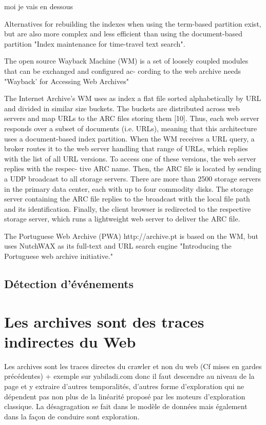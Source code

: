 \documentclass[symmetric,justified,marginals=raggedouter]{tufte-book}
\begin{document}
moi je vais en dessous 

Alternatives  for  rebuilding  the  indexes
when using the term-based partition exist, but are also more
complex  and  less  efficient  than  using  the  document-based
partition "Index maintenance for time-travel text
search".

The open source Wayback Machine (WM) is a set of loosely
coupled modules that can be exchanged and configured ac-
cording  to  the  web  archive  needs  "Wayback’ for Accessing Web Archives"

The Internet Archive’s WM uses as index a flat file sorted
alphabetically by URL and divided in similar size buckets.
The  buckets  are  distributed  across  web  servers  and  map
URLs to the ARC files storing them [10].  Thus, each web
server  responds  over  a  subset  of  documents  (i.e.   URLs),
meaning that this architecture uses a document-based index
partition.   When the WM receives  a URL query,  a broker
routes  it  to  the  web  server  handling  that  range  of  URLs,
which  replies  with  the  list  of  all  URL  versions.   To  access
one of these versions, the web server replies with the respec-
tive ARC name.  Then, the ARC file is located by sending a
UDP broadcast to all storage servers.  There are more than
2500 storage servers in the primary data center, each with up
to four commodity disks.  The storage server containing the
ARC file replies to the broadcast with the local file path and
its identification.  Finally, the client browser is redirected to
the respective storage server, which runs a lightweight web
server to deliver the ARC file.

The  Portuguese  Web  Archive  (PWA)
http://archive.pt
is  based  on  the
WM, but uses NutchWAX as its full-text and URL search
engine "Introducing the Portuguese web archive initiative."

\subsection{Détection d'événements}

\section{Les archives sont des traces indirectes du Web}
\label{sec:4_legacy}

Les archives sont les traces directes du crawler et non du web (Cf mises en gardes précédentes) + exemple sur yabiladi.com donc il faut descendre au niveau de la page et y extraire d'autres temporalités, d'autres forme d'exploration qui ne dépendent pas non plus de la linéarité proposé par les moteurs d'exploration classique.
La désagragation se fait dans le modèle de données mais également dans la façon de conduire sont exploration. 
\end{document}
